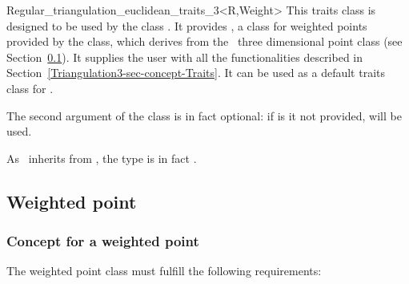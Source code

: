 	\begin{ccClassTemplate}{Regular_triangulation_euclidean_traits_3<R,Weight>}
This traits class is designed to be used by the class
. It provides
, a class for weighted points
provided by the class, which derives from the \cgal\ three dimensional
point class (see
Section~\ref{Triangulation3-sec-class-Weightedpoints}). It supplies
the user with all the functionalities 
described in Section~\ref{Triangulation3-sec-concept-Traits}.
 It can be used as a default traits
class for .

The second argument  of the class
 is in fact
optional: if is it not provided,  will be used.



\ccTypes
{}

\ccGlue
{}

As \ccClassTemplateName\ inherits from
, the  type is in
fact .

	\end{ccClassTemplate}

		\subsection{Weighted point}	
		\label{Triangulation3-sec-class-Weightedpoints}

		\subsubsection{Concept for a weighted point}

The weighted point class must fulfill the following requirements:

\ccTypes
{}
\ccGlue
{}
\ccGlue
{}

